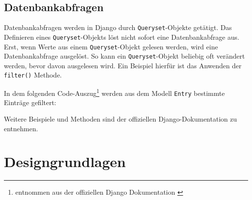 \hypertarget{datenbankabfragen}{%
\subsection{Datenbankabfragen}\label{datenbankabfragen}}

Datenbankabfragen werden in Django durch \texttt{Queryset}-Objekte
getätigt. Das Definieren eines \texttt{Queryset}-Objekts löst nicht
sofort eine Datenbankabfrage aus. Erst, wenn Werte aus einem
\texttt{Queryset}-Objekt gelesen werden, wird eine Datenbankabfrage
ausgelöst. So kann ein \texttt{Queryset}-Objekt beliebig oft verändert
werden, bevor davon ausgelesen wird. Ein Beispiel hierfür ist das
Anwenden der \texttt{filter()} Methode.

In dem folgenden Code-Auszug\footnote{entnommen aus der offiziellen
  Django Dokumentation \cite{django-doku-queries}} werden aus dem Modell
\texttt{Entry} bestimmte Einträge gefiltert:

\begin{Shaded}
\begin{Highlighting}[]
\OperatorTok{=}\OperatorTok{=}\NormalTok{)}

\OperatorTok{=}\OperatorTok{=}

\OperatorTok{=}\OperatorTok{=}\NormalTok{)}

\end{Highlighting}
\end{Shaded}

Weitere Beispiele und Methoden sind der offiziellen Django-Dokumentation
zu entnehmen. \cite{django-doku-queries}

\hypertarget{designgrundlagen}{%
\section{Designgrundlagen}\label{designgrundlagen}}

